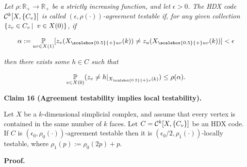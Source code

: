 \emph{Let $\rho:\mathbb{R}_{+}\to\mathbb{R}_{+}$ be a strictly increasing function, and let $\epsilon>0$.
The HDX code ${\cal C}^{k}[X,\{C_{v}\}]$ is called $(\epsilon,\rho(\cdot))$-agreement testable if, for any given collection $\left\{z_{v}\in C_{v}\left|\;\vphantom{z_{v}\in C_{v}v\in X(0)}\right.v\in X(0)\right\}$, if}\par


\[\begin{gathered}
\alpha:=\operatorname*{\mathbb{P}}_{uv\in X(1)}[z_{v}({X}_{\scalebox{0.5}{+}uv}(k))\neq z_{u}({X}_{\scalebox{0.5}{+}uv}(k))]<\epsilon
\end{gathered}\]


\emph{then there exists some $h\in C$ such that}\par


\[\begin{gathered}
\operatorname*{\mathbb{P}}_{v\in X(0)}(z_{v}\neq h|_{{X}_{\scalebox{0.5}{+}v}(k)})\leq\rho(\alpha).
\end{gathered}\]







\par\medskip\noindent\textbf{
Claim 16 (Agreement testability implies local testability). 
}\par



Let $X$ be a $k$-dimensional simplicial complex, and assume that every vertex is contained in the same number of $k$ faces. Let $C={\cal C}^{k}[X,\{C_{v}\}]$ be an HDX code.
If $C$ is $(\epsilon_{0},\rho_{0}(\cdot))$-agreement testable then it is $(\epsilon_{0}/2,\rho_{1}(\cdot))$-locally testable, where $\rho_{1}(p):=\rho_{0}(2p)+p$.\par







\par\medskip\noindent\textbf{
\textbf{Proof}.}\par




